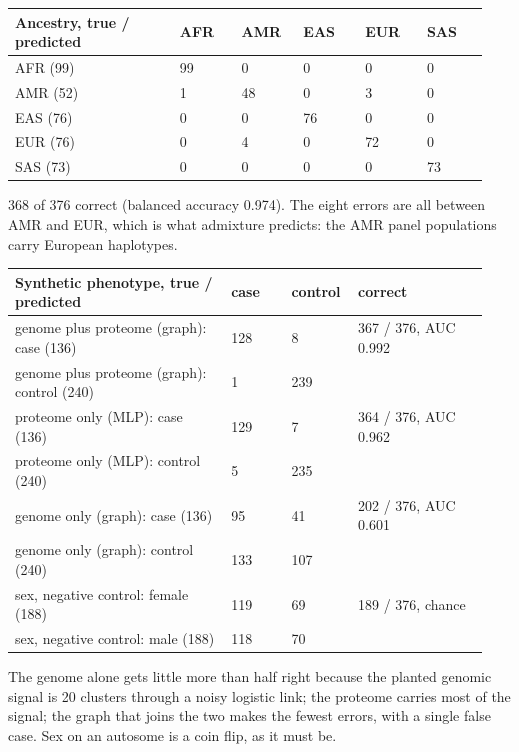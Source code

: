 \documentclass[11pt,a4paper]{article}
\begin{document}
\begin{longtable}{p{0.329\linewidth}p{0.122\linewidth}p{0.122\linewidth}p{0.122\linewidth}p{0.122\linewidth}p{0.122\linewidth}}
\toprule
\textbf{Ancestry, true / predicted} & \textbf{AFR} & \textbf{AMR} & \textbf{EAS} & \textbf{EUR} & \textbf{SAS} \\
\midrule
\endhead
AFR (99) & 99 & 0 & 0 & 0 & 0 \\
AMR (52) & 1 & 48 & 0 & 3 & 0 \\
EAS (76) & 0 & 0 & 76 & 0 & 0 \\
EUR (76) & 0 & 4 & 0 & 72 & 0 \\
SAS (73) & 0 & 0 & 0 & 0 & 73 \\
\bottomrule
\end{longtable}

368 of 376 correct (balanced accuracy 0.974). The eight errors are all between AMR and EUR, which is what admixture predicts: the AMR panel populations carry European haplotypes.

\begin{longtable}{p{0.432\linewidth}p{0.122\linewidth}p{0.122\linewidth}p{0.263\linewidth}}
\toprule
\textbf{Synthetic phenotype, true / predicted} & \textbf{case} & \textbf{control} & \textbf{correct} \\
\midrule
\endhead
genome plus proteome (graph): case (136) & 128 & 8 & 367 / 376, AUC 0.992 \\
genome plus proteome (graph): control (240) & 1 & 239 &  \\
proteome only (MLP): case (136) & 129 & 7 & 364 / 376, AUC 0.962 \\
proteome only (MLP): control (240) & 5 & 235 &  \\
genome only (graph): case (136) & 95 & 41 & 202 / 376, AUC 0.601 \\
genome only (graph): control (240) & 133 & 107 &  \\
sex, negative control: female (188) & 119 & 69 & 189 / 376, chance \\
sex, negative control: male (188) & 118 & 70 &  \\
\bottomrule
\end{longtable}

The genome alone gets little more than half right because the planted genomic signal is 20 clusters through a noisy logistic link; the proteome carries most of the signal; the graph that joins the two makes the fewest errors, with a single false case. Sex on an autosome is a coin flip, as it must be.
\end{document}
